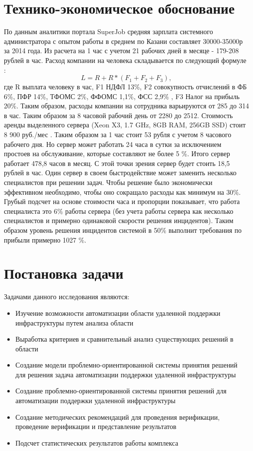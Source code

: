 \section{Технико-экономическое обоснование} \label{Economic}
По данным аналитики портала SuperJob \cite{SuperJob} средняя зарплата системного администратора с опытом работы в среднем по Казани составляет 30000-35000р за 2014 года. Из расчета на 1 час с учетом 21 рабочих дней в месяце - 179-208 рублей в час. Расход компании на человека складывается по следующий формуле \cite{FiscalCodecs} :
\[
L = R + R*(F_1 +F_2+F_3),
\]
где R выплата человеку в час, F1 НДФЛ 13\%, F2 совокупность отчислений в ФБ 6\%, ПФР 14\%, ТФОМС 2\%, ФФОМС 1,1\%, ФСС 2,9\% , F3 Налог на прибыль 20\%. 
Таким образом, расходы компании на сотрудника варьируются от 285 до 314 в час. Таким образом за 8 часовой рабочий день от 2280 до 2512. Стоимость аренды выделенного сервера (Xeon X3, 1.7 GHz, 8GB RAM, 256GB SSD) стоит 8 900 руб./мес \cite{TimeWeb}. Таким образом за 1 час стоит 53 рубля с учетом 8 часового рабочего дня. Но сервер может работать 24 часа в сутки за исключением простоев на обслуживание, которые составляют не более 5 \%. Итого сервер работает 478,8 часов в месяц. С этой точки зрения сервер будет стоить 18,5 рублей в час. Один сервер в своем быстродействие может заменить несколько специалистов при решении задач. Чтобы решение было экономически эффективном необходимо, чтобы оно сокращало расходы как минимум на 30\%. Грубый подсчет на основе стоимости часа и пропорции показывает, что работа специалиста это 6\% работы сервера (без учета работы сервера как несколько специалистов и примерно одинаковой скорости решения инцидентов). Таким образом уровень решения инцидентов системой в 50\% выполнит требования по прибыли примерно 1027 \%. 
\section{Постановка задачи} \label{sect1_4}
Задачами данного исследования являются:
\begin{itemize}
	\item Изучение возможности автоматизации области удаленной поддержки инфраструктуры путем анализа области
	\item Выработка критериев и сравнительный анализ существующих решений в области
	\item Создание модели проблемно-ориентированной системы принятия решений для решения задача автоматизации поддержки удаленной инфраструктуры
	\item Создание проблемно-ориентированной системы принятия решений для автоматизации поддержки удаленной инфраструктуры
	\item Создание методических рекомендаций для проведения верификации, проведение верификации и представление результатов 
	\item Подсчет статистических результатов работы комплекса

\end{itemize}



\clearpage
